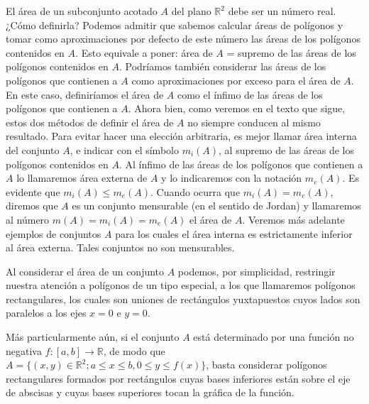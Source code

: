 \documentclass[12pt,oneside]{book}
\begin{document}
El área de un subconjunto acotado \(A\) del plano \(\mathbb{R}^2\) debe ser un número real. ¿Cómo definirla? Podemos admitir que sabemos calcular áreas de polígonos y tomar como aproximaciones por defecto de este número las áreas de los polígonos contenidos en \(A\). Esto equivale a poner: área de \(A\) = supremo de las áreas de los polígonos contenidos en \(A\). Podríamos también considerar las áreas de los polígonos que contienen a \(A\) como aproximaciones por exceso para el área de \(A\). En este caso, definiríamos el área de \(A\) como el ínfimo de las áreas de los polígonos que contienen a \(A\). Ahora bien, como veremos en el texto que sigue, estos dos métodos de definir el área de \(A\) no siempre conducen al mismo resultado. Para evitar hacer una elección arbitraria, es mejor llamar área interna del conjunto \(A\), e indicar con el símbolo \(m_i(A)\), al supremo de las áreas de los polígonos contenidos en \(A\). Al ínfimo de las áreas de los polígonos que contienen a \(A\) lo llamaremos área externa de \(A\) y lo indicaremos con la notación \(m_e(A)\). Es evidente que \(m_i(A) \leq m_e(A)\). Cuando ocurra que \(m_i(A) = m_e(A)\), diremos que \(A\) es un conjunto mensurable (en el sentido de Jordan) y llamaremos al número \(m(A) = m_i(A) = m_e(A)\) el área de \(A\). Veremos más adelante ejemplos de conjuntos \(A\) para los cuales el área interna es estrictamente inferior al área externa. Tales conjuntos no son mensurables.

Al considerar el área de un conjunto \(A\) podemos, por simplicidad, restringir nuestra atención a polígonos de un tipo especial, a los que llamaremos polígonos rectangulares, los cuales son uniones de rectángulos yuxtapuestos cuyos lados son paralelos a los ejes \(x = 0\) e \(y = 0\).

Más particularmente aún, si el conjunto \(A\) está determinado por una función no negativa \(f: [a, b] \to \mathbb{R}\), de modo que \(A = \{(x, y) \in \mathbb{R}^2; a \leq x \leq b, 0 \leq y \leq f(x)\}\), basta considerar polígonos rectangulares formados por rectángulos cuyas bases inferiores están sobre el eje de abscisas y cuyas bases superiores tocan la gráfica de la función.
\end{document}
